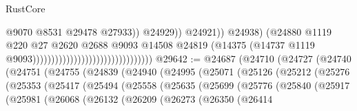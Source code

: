 \begin{lexlean}{RustCore}
\begin{coremodule}
                                                                            @9070
                                                                            @8531
                                                                            @29478
                                                                            @27933))
                                                                        @24929))
                                                                    @24921))
                                                                @24938)
                                                              (@24880
                                                                @1119
                                                                @220
                                                                @27
                                                                @2620
                                                                @2688
                                                                @9093
                                                                @14508
                                                                @24819
                                                                (@14375
                                                                  (@14737
                                                                    @1119
                                                                    @9093))))))))))))))))))))))))))))))))
@29642 := @24687
    (@24710
      (@24727
        (@24740
          (@24751
            (@24755
              (@24839
                (@24940
                  (@24995
                    (@25071
                      (@25126
                        (@25212
                          (@25276
                            (@25353
                              (@25417
                                (@25494
                                  (@25558
                                    (@25635
                                      (@25699
                                        (@25776
                                          (@25840
                                            (@25917
                                              (@25981
                                                (@26068
                                                  (@26132
                                                    (@26209
                                                      (@26273
                                                        (@26350
                                                          (@26414

\end{coremodule}
\end{lexlean}
